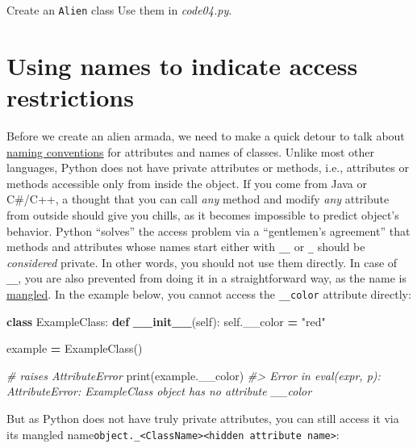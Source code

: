 \documentclass[
]{book}
\newenvironment{Shaded}{\begin{snugshade}}{\end{snugshade}}
\newcommand{\BuiltInTok}[1]{#1}
\newcommand{\CommentTok}[1]{\textcolor[rgb]{0.56,0.35,0.01}{\textit{#1}}}
\newcommand{\FunctionTok}[1]{\textcolor[rgb]{0.13,0.29,0.53}{\textbf{#1}}}
\newcommand{\KeywordTok}[1]{\textcolor[rgb]{0.13,0.29,0.53}{\textbf{#1}}}
\newcommand{\NormalTok}[1]{#1}
\newcommand{\OperatorTok}[1]{\textcolor[rgb]{0.81,0.36,0.00}{\textbf{#1}}}
\newcommand{\StringTok}[1]{\textcolor[rgb]{0.31,0.60,0.02}{#1}}
\newcommand{\VariableTok}[1]{\textcolor[rgb]{0.00,0.00,0.00}{#1}}
\begin{document}
Create an \texttt{Alien} class
Use them in \emph{code04.py}.

\hypertarget{using-names-to-indicate-access-restrictions}{%
\section{Using names to indicate access restrictions}\label{using-names-to-indicate-access-restrictions}}

Before we create an alien armada, we need to make a quick detour to talk about \href{https://peps.python.org/pep-0008}{naming conventions} for attributes and names of classes. Unlike most other languages, Python does not have private attributes or methods, i.e., attributes or methods accessible only from inside the object. If you come from Java or C\#/C++, a thought that you can call \emph{any} method and modify \emph{any} attribute from outside should give you chills, as it becomes impossible to predict object's behavior. Python ``solves'' the access problem via a ``gentlemen's agreement'' that methods and attributes whose names start either with \texttt{\_\_} or \texttt{\_} should be \emph{considered} private. In other words, you should not use them directly. In case of \texttt{\_\_}, you are also prevented from doing it in a straightforward way, as the name is \href{https://peps.python.org/pep-0008/\#descriptive-naming-styles}{mangled}. In the example below, you cannot access the \texttt{\_\_color} attribute directly:

\begin{Shaded}
\begin{Highlighting}[]
\KeywordTok{class}\NormalTok{ ExampleClass:}
  \KeywordTok{def} \FunctionTok{\_\_init\_\_}\NormalTok{(}\VariableTok{self}\NormalTok{):}
    \VariableTok{self}\NormalTok{.\_\_color }\OperatorTok{=} \StringTok{"red"}

\NormalTok{example }\OperatorTok{=}\NormalTok{ ExampleClass()}

\CommentTok{\# raises AttributeError}
\BuiltInTok{print}\NormalTok{(example.\_\_color)}
\CommentTok{\#\textgreater{} Error in eval(expr, p): AttributeError: \textquotesingle{}ExampleClass\textquotesingle{} object has no attribute \textquotesingle{}\_\_color\textquotesingle{}}
\end{Highlighting}
\end{Shaded}

But as Python does not have truly private attributes, you can still access it via its mangled name\texttt{object.\_\textless{}ClassName\textgreater{}\textless{}hidden\ attribute\ name\textgreater{}}:
\end{document}
